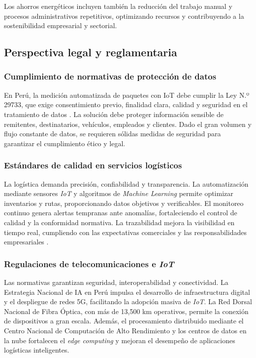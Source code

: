 Los ahorros energéticos incluyen también la reducción del trabajo manual y procesos administrativos repetitivos, optimizando recursos y contribuyendo a la sostenibilidad empresarial y sectorial.

\subsection{Perspectiva legal y reglamentaria}
\subsubsection{Cumplimiento de normativas de protección de datos}

En Perú, la medición automatizada de paquetes con IoT debe cumplir la Ley N.º 29733, que exige consentimiento previo, finalidad clara, calidad y seguridad en el tratamiento de datos \cite{EditoraPer2973}.
La solución debe proteger información sensible de remitentes, destinatarios, vehículos, empleados y clientes. Dado el gran volumen y flujo constante de datos, se requieren sólidas medidas de seguridad para garantizar el cumplimiento ético y legal.

\subsubsection{Estándares de calidad en servicios logísticos}
La logística demanda precisión, confiabilidad y transparencia. La automatización mediante sensores \textit{IoT} y algoritmos de \textit{Machine Learning} permite optimizar inventarios y rutas, proporcionando datos objetivos y verificables. El monitoreo continuo genera alertas tempranas ante anomalías, fortaleciendo el control de calidad y la conformidad normativa. La trazabilidad mejora la visibilidad en tiempo real, cumpliendo con las expectativas comerciales y las responsabilidades empresariales \cite{ArticleRef255132, ArticleRef255131}.

\subsubsection{Regulaciones de telecomunicaciones e \textit{IoT}}
Las normativas garantizan seguridad, interoperabilidad y conectividad. La Estrategia Nacional de IA en Perú impulsa el desarrollo de infraestructura digital y el despliegue de redes 5G, facilitando la adopción masiva de \textit{IoT}. La Red Dorsal Nacional de Fibra Óptica, con más de 13{,}500 km operativos, permite la conexión de dispositivos a gran escala. Además, el procesamiento distribuido mediante el Centro Nacional de Computación de Alto Rendimiento y los centros de datos en la nube fortalecen el \textit{edge computing} y mejoran el desempeño de aplicaciones logísticas inteligentes.

